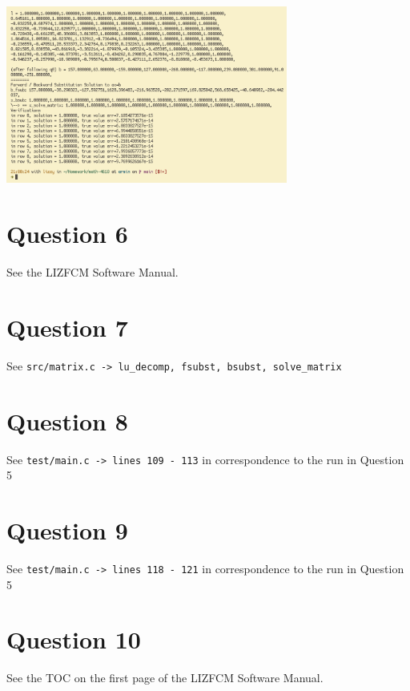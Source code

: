 \documentclass[11pt]{article}
\begin{document}
\begin{center}
\includegraphics[width=350px]{./img/test_routine_2.png}
\end{center}

\section{Question 6}
\label{sec:org9e2023c}
See the LIZFCM Software Manual.

\section{Question 7}
\label{sec:org6c11571}
See \texttt{src/matrix.c -> lu\_decomp, fsubst, bsubst, solve\_matrix}

\section{Question 8}
\label{sec:org9ba7792}
See \texttt{test/main.c -> lines 109 - 113} in correspondence to the run in Question 5

\section{Question 9}
\label{sec:org3cff888}
See \texttt{test/main.c -> lines 118 - 121} in correspondence to the run in Question 5

\section{Question 10}
\label{sec:org522eabc}
See the TOC on the first page of the LIZFCM Software Manual.
\end{document}
